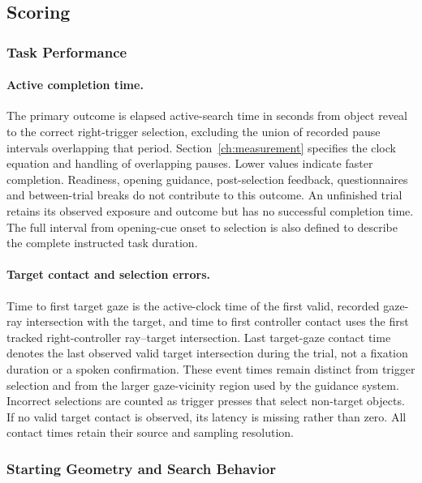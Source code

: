\subsection{Scoring}
\label{sec:scoring}
\subsubsection{Task Performance}
\paragraph{Active completion time.} The primary outcome is elapsed active-search time in seconds from object reveal to the correct right-trigger selection, excluding the union of recorded pause intervals overlapping that period. Section~\ref{ch:measurement} specifies the clock equation and handling of overlapping pauses. Lower values indicate faster completion. Readiness, opening guidance, post-selection feedback, questionnaires and between-trial breaks do not contribute to this outcome. An unfinished trial retains its observed exposure and outcome but has no successful completion time. The full interval from opening-cue onset to selection is also defined to describe the complete instructed task duration.

\paragraph{Target contact and selection errors.} Time to first target gaze is the active-clock time of the first valid, recorded gaze-ray intersection with the target, and time to first controller contact uses the first tracked right-controller ray--target intersection. Last target-gaze contact time denotes the last observed valid target intersection during the trial, not a fixation duration or a spoken confirmation. These event times remain distinct from trigger selection and from the larger gaze-vicinity region used by the guidance system. Incorrect selections are counted as trigger presses that select non-target objects. If no valid target contact is observed, its latency is missing rather than zero. All contact times retain their source and sampling resolution.

\subsubsection{Starting Geometry and Search Behavior}
